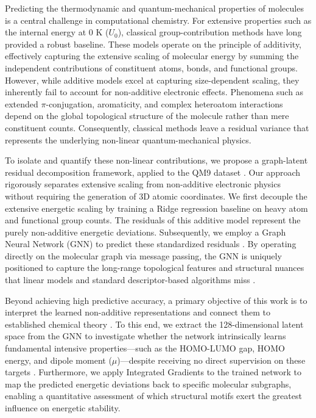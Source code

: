 \documentclass[]{article}
\begin{document}
Predicting the thermodynamic and quantum-mechanical properties of molecules is a central challenge in computational chemistry. For extensive properties such as the internal energy at 0 K ($U_0$), classical group-contribution methods have long provided a robust baseline. These models operate on the principle of additivity, effectively capturing the extensive scaling of molecular energy by summing the independent contributions of constituent atoms, bonds, and functional groups. However, while additive models excel at capturing size-dependent scaling, they inherently fail to account for non-additive electronic effects. Phenomena such as extended $\pi$-conjugation, aromaticity, and complex heteroatom interactions depend on the global topological structure of the molecule rather than mere constituent counts. Consequently, classical methods leave a residual variance that represents the underlying non-linear quantum-mechanical physics.

To isolate and quantify these non-linear contributions, we propose a graph-latent residual decomposition framework, applied to the QM9 dataset \citep{fu2025benchmarkquantumchemistryrelaxations}. Our approach rigorously separates extensive scaling from non-additive electronic physics without requiring the generation of 3D atomic coordinates. We first decouple the extensive energetic scaling by training a Ridge regression baseline on heavy atom and functional group counts. The residuals of this additive model represent the purely non-additive energetic deviations. Subsequently, we employ a Graph Neural Network (GNN) to predict these standardized residuals \citep{schütt2016quantumchemicalinsightsdeeptensor,xiang2025edbenchlargescaleelectrondensity}. By operating directly on the molecular graph via message passing, the GNN is uniquely positioned to capture the long-range topological features and structural nuances that linear models and standard descriptor-based algorithms miss \citep{schütt2016quantumchemicalinsightsdeeptensor,esders2024analyzingatomicinteractionsmolecules,xiang2025edbenchlargescaleelectrondensity}.

Beyond achieving high predictive accuracy, a primary objective of this work is to interpret the learned non-additive representations and connect them to established chemical theory \citep{wang2023graphneuralnetworksmolecules,liu2026latentflowvisualanalyticslatent,han2026multimodalmolecularrepresentationlearning}. To this end, we extract the 128-dimensional latent space from the GNN to investigate whether the network intrinsically learns fundamental intensive properties---such as the HOMO-LUMO gap, HOMO energy, and dipole moment ($\mu$)---despite receiving no direct supervision on these targets \citep{choi2022scalabletraininggraphconvolutional,liu2026enhancingmolecularpropertypredictions,chakraborty2026duallevelatomiccoordinationgeometry}. Furthermore, we apply Integrated Gradients to the trained network to map the predicted energetic deviations back to specific molecular subgraphs, enabling a quantitative assessment of which structural motifs exert the greatest influence on energetic stability.
\end{document}
